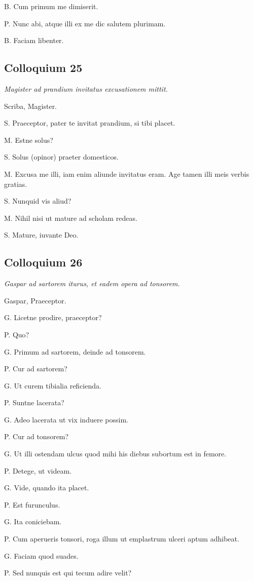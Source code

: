 \documentclass{article}
\begin{document}
B. Cum primum me dimiserit.

P. Nunc abi, atque illi ex me dic salutem plurimam.

B. Faciam libenter.

\subsection{Colloquium 25}
\emph{Magister ad prandium invitatus excusationem mittit.}

Scriba, Magister.

S. Praeceptor, pater te invitat prandium, si tibi placet.

M. Estne solus?

S. Solus (opinor) praeter domesticos.

M. Excusa me illi, iam enim aliunde invitatus eram. Age tamen illi meis verbis gratias.

S. Nunquid vis aliud?

M. Nihil nisi ut mature ad scholam redeas.

S. Mature, iuvante Deo.

\subsection{Colloquium 26}
\emph{Gaspar ad sartorem iturus, et eadem opera ad tonsorem.}

Gaspar, Praeceptor.

G. Licetne prodire, praeceptor?

P. Quo?

G. Primum ad sartorem, deinde ad tonsorem.

P. Cur ad sartorem?

G. Ut curem tibialia reficienda.

P. Suntne lacerata?

G. Adeo lacerata ut vix induere possim.

P. Cur ad tonsorem?

G. Ut illi ostendam ulcus quod mihi his diebus subortum est in femore.

P. Detege, ut videam.

G. Vide, quando ita placet.

P. Est furunculus.

G. Ita coniciebam.

P. Cum aperueris tonsori, roga illum ut emplastrum ulceri aptum adhibeat.

G. Faciam quod suades.

P. Sed nunquis est qui tecum adire velit?
\end{document}
